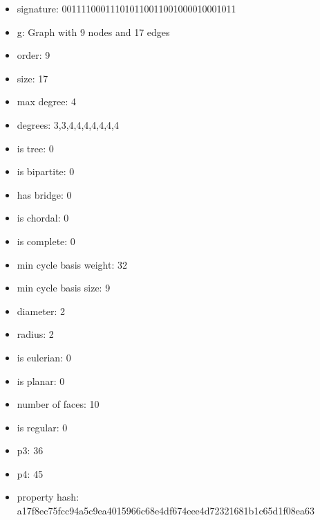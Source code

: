 \newpage
\begin{figure}
\end{figure}
\begin{itemize}
\item signature: 001111000111010110011001000010001011
\item g: Graph with 9 nodes and 17 edges
\item order: 9
\item size: 17
\item max degree: 4
\item degrees: 3,3,4,4,4,4,4,4,4
\item is tree: 0
\item is bipartite: 0
\item has bridge: 0
\item is chordal: 0
\item is complete: 0
\item min cycle basis weight: 32
\item min cycle basis size: 9
\item diameter: 2
\item radius: 2
\item is eulerian: 0
\item is planar: 0
\item number of faces: 10
\item is regular: 0
\item p3: 36
\item p4: 45
\item property hash: a17f8ec75fcc94a5c9ea4015966c68e4df674eee4d72321681b1c65d1f08ea63
\end{itemize}

